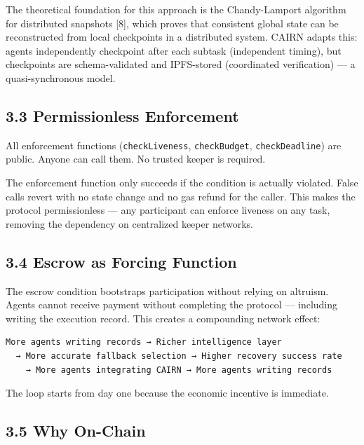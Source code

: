 \documentclass[
  10pt,
]{article}
\begin{document}
The theoretical foundation for this approach is the Chandy-Lamport
algorithm for distributed snapshots {[}8{]}, which proves that
consistent global state can be reconstructed from local checkpoints in a
distributed system. CAIRN adapts this: agents independently checkpoint
after each subtask (independent timing), but checkpoints are
schema-validated and IPFS-stored (coordinated verification) --- a
quasi-synchronous model.

\hypertarget{permissionless-enforcement}{%
\subsection{3.3 Permissionless
Enforcement}\label{permissionless-enforcement}}

All enforcement functions (\texttt{checkLiveness}, \texttt{checkBudget},
\texttt{checkDeadline}) are public. Anyone can call them. No trusted
keeper is required.

The enforcement function only succeeds if the condition is actually
violated. False calls revert with no state change and no gas refund for
the caller. This makes the protocol permissionless --- any participant
can enforce liveness on any task, removing the dependency on centralized
keeper networks.

\hypertarget{escrow-as-forcing-function}{%
\subsection{3.4 Escrow as Forcing
Function}\label{escrow-as-forcing-function}}

The escrow condition bootstraps participation without relying on
altruism. Agents cannot receive payment without completing the protocol
--- including writing the execution record. This creates a compounding
network effect:

\begin{verbatim}
More agents writing records → Richer intelligence layer
  → More accurate fallback selection → Higher recovery success rate
    → More agents integrating CAIRN → More agents writing records
\end{verbatim}

The loop starts from day one because the economic incentive is
immediate.

\hypertarget{why-on-chain}{%
\subsection{3.5 Why On-Chain}\label{why-on-chain}}
\end{document}
